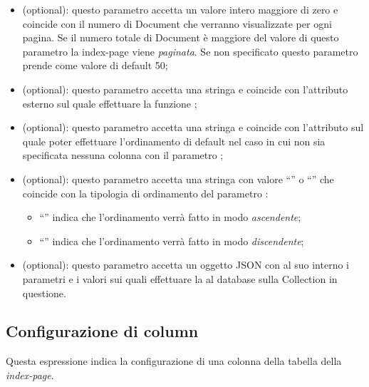 \begin{itemize}

	\item \textbf{} (optional): questo parametro accetta un valore intero maggiore di zero e coincide con il numero di Document che verranno visualizzate per ogni pagina. Se il numero totale di Document è maggiore del valore di questo parametro la index-page viene \textit{paginata}. Se non specificato questo parametro prende come valore di default 50;
	\item \textbf{} (optional): questo parametro accetta una stringa e coincide con l'attributo esterno sul quale effettuare la funzione ;
	\item \textbf{} (optional): questo parametro accetta una stringa e coincide con l'attributo sul quale poter effettuare l'ordinamento di default nel caso in cui non sia specificata nessuna colonna con il parametro ;
	\item \textbf{} (optional): questo parametro accetta una stringa con valore ``'' o ``'' che coincide con la tipologia di ordinamento del parametro :
	\begin{itemize}

		\item ``'' indica che l'ordinamento verrà fatto in modo \textit{ascendente};
		\item ``'' indica che l'ordinamento verrà fatto in modo \textit{discendente};	
	
	\end{itemize}
	\item \textbf{} (optional): questo parametro accetta un oggetto JSON con al suo interno i parametri e i valori sui quali effettuare la  al database sulla Collection in questione.
\end{itemize}

\subsection{Configurazione di column}

Questa espressione indica la configurazione di una colonna della tabella della \textit{index-page}.

